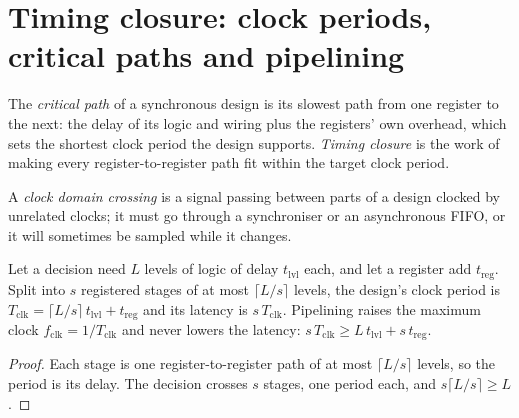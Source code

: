 \label{lst:nw:programmable-hardware-i-architecture-and-toolchain:field}

\section{Timing closure: clock periods, critical paths and pipelining}

\begin{definition}\label{def:nw:programmable-hardware-i-architecture-and-toolchain:timing}
The \emph{critical path} of a synchronous design is its slowest path from one register to the next: the delay of
its logic and wiring plus the registers' own overhead, which sets the shortest clock period the design supports. \emph{Timing
closure} is the work of making every register-to-register path fit within the target clock period.
\end{definition}

\begin{definition}\label{def:nw:programmable-hardware-i-architecture-and-toolchain:cdc}
A \emph{clock domain crossing} is a signal passing between parts of a design clocked by unrelated clocks;
it must go through a synchroniser or an asynchronous FIFO, or it will sometimes be sampled while it changes.
\end{definition}

\begin{proposition}\label{prop:nw:programmable-hardware-i-architecture-and-toolchain:pipe}
Let a decision need $L$ levels of logic of delay $t_{\mathrm{lvl}}$ each, and let a register add $t_{\mathrm{reg}}$. Split into $s$
registered stages of at most $\lceil L/s\rceil$ levels, the design's clock period is $T_{\mathrm{clk}} = \lceil L/s\rceil\,t_{\mathrm{lvl}}
+ t_{\mathrm{reg}}$ and its latency is $s\,T_{\mathrm{clk}}$. Pipelining raises the maximum clock $f_{\mathrm{clk}} = 1/T_{\mathrm{clk}}$
and never lowers the latency: $s\,T_{\mathrm{clk}} \ge L\,t_{\mathrm{lvl}} + s\,t_{\mathrm{reg}}$.
\end{proposition}

\begin{proof}
Each stage is one register-to-register path of at most $\lceil L/s\rceil$ levels, so the period is its delay. The decision crosses $s$
stages, one period each, and $s\lceil L/s\rceil \ge L$.
\end{proof}

